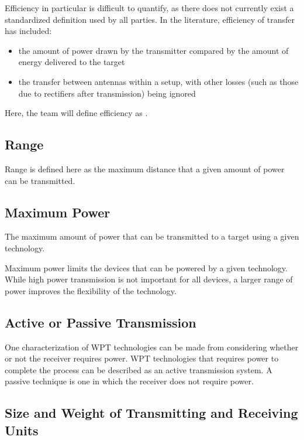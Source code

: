 Efficiency in particular is difficult to quantify, as there does not currently exist a standardized definition used by all parties. In the literature, efficiency of transfer has included:
\begin{itemize}
    \item the amount of power drawn by the transmitter compared by the amount of energy delivered to the target
    \item the transfer between antennas within a setup, with other losses (such as those due to rectifiers after transmission) being ignored
\end{itemize}

Here, the team will define efficiency as .

\subsection{Range}

Range is defined here as the maximum distance that a given amount of power can be transmitted.\\

\subsection{Maximum Power}

The maximum amount of power that can be transmitted to a target using a given technology.

Maximum power limits the devices that can be powered by a given technology. While high power transmission is not important for all devices, a larger range of power improves the flexibility of the technology.

\subsection{Active or Passive Transmission}

One characterization of WPT technologies can be made from considering whether or not the receiver requires power. WPT technologies that requires power to complete the process can be described as an active transmission system. A passive technique is one in which the receiver does not require power.

\subsection{Size and Weight of Transmitting and Receiving Units}

